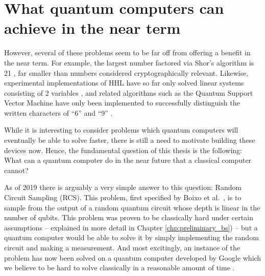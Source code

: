 \section{What quantum computers can achieve in the near term}
\label{sec:near-term-power}

However, several of these problems seem to be far off from offering a benefit in the near term. For example, the largest number factored via Shor's algorithm is 21 \cite{martinlopez2012}, far smaller than numbers considered cryptographically relevant. Likewise, experimental implementations of HHL have so far only solved linear systems consisting of 2 variables \cite{cai2013, pan2014, barz2014}, and related algorithms such as the Quantum Support Vector Machine have only been implemented to successfully distinguish the written characters of ``6'' and ``9'' \cite{li2015}.

While it is interesting to consider problems which quantum computers will eventually be able to solve faster, there is still a need to motivate building these devices now. Hence, the fundamental question of this thesis is the following: What can a quantum computer do in the near future that a classical computer cannot?

As of 2019 there is arguably a very simple answer to this question: Random Circuit Sampling (RCS). This problem, first specified by Boixo et al.~\cite{boixo2018}, is to sample from the output of a random quantum circuit whose depth is linear in the number of qubits. This problem was proven to be classically hard under certain assumptions \cite{hangleiter2018, bouland2018} -- explained in more detail in Chapter \ref{chp:preliminary_bs}) -- but a quantum computer would be able to solve it by simply implementing the random circuit and making a measurement. And most excitingly, an instance of the problem has now been solved on a quantum computer developed by Google which we believe to be hard to solve classically in a reasonable amount of time \cite{arute2019}.

